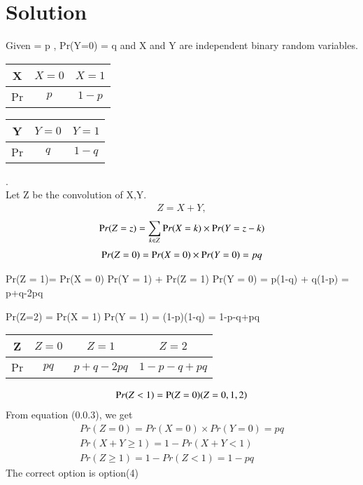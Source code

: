 \documentclass[journal,12pt,twocolumn]{IEEEtran}
\begin{document}
\section*{Solution}
 Given  = p , Pr(Y=0) = q and  X and Y are independent binary random variables.\\
 \begin{center}
 \begin{tabular}{| c| c| c| }
  \hline
 X & $X=0$ & $X=1$\\ 
 \hline
Pr &$p$ & $1-p$ \\  
 \hline
\end{tabular}\hfill
\begin{tabular}{| c| c| c| }
  \hline
 Y & $Y=0$ & $Y=1$\\ 
 \hline
Pr &$q$ & $1-q$ \\  
 \hline
\end{tabular}
 \end{center}
 .\\
Let Z be the convolution of X,Y.
\begin{align}
  Z=X+Y,
  \end{align}
  \begin{align}
   \mbox Pr(Z = z) = \sum_{k\in Z}  \mbox Pr(X = k) \times  \mbox Pr(Y = z-k)
   \end{align}
   \begin{align}
  \mbox Pr(Z=0)= \mbox Pr(X = 0) \times \mbox Pr(Y = 0) = pq
  \end{align}
  \begin{multiline*}
  \mbox Pr(Z = 1)= \mbox Pr(X = 0) \times \mbox Pr(Y = 1)  +  \mbox Pr(Z = 1) \times \mbox Pr(Y = 0) = p(1-q) + q(1-p) = p+q-2pq
 \end{multiline*}
 \begin{multiline*}
  \mbox Pr(Z=2) = \mbox Pr(X = 1) \times \mbox Pr(Y = 1) = (1-p)(1-q) = 1-p-q+pq
 \end{multiline*}
 \begin{center}
 \begin{tabular}{| c| c| c| c|}
  \hline
Z& $Z=0$ & $Z=1$ & $Z=2$ \\
 \hline
Pr &$pq$ & $p+q-2pq$ & $1-p-q+pq$ \\
 \hline
\end{tabular}
\end{center}
  \begin{align}
  \mbox Pr(Z<1) = \mbox P(Z=0)(Z={0,1,2})
  \end{align}
  From equation (0.0.3), we get
  \begin{align}
  Pr(Z=0)= Pr(X = 0) \times Pr(Y = 0) = pq\\
  Pr(X+Y\geq1) = 1 - Pr(X+Y<1)\\
  Pr(Z\geq1)= 1-Pr(Z<1) = 1-pq
 \end{align} 
 The correct option is option(4)
\end{document}
